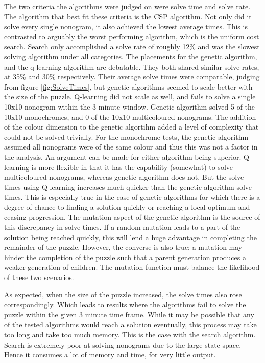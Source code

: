 \documentclass{svproc}
\begin{document}
The two criteria the algorithms were judged on were solve time and solve rate. The algorithm that best fit these criteria is the CSP algorithm.
Not only did it solve every single nonogram, it also achieved the lowest average times.
This is contrasted to arguably the worst performing algorithm, which is the uniform cost search.
Search only accomplished a solve rate of roughly 12\% and was the slowest solving algorithm under all categories.
The placements for the genetic algorithm, and the q-learning algorithm are debatable.
They both shared similar solve rates, at 35\% and 30\% respectively.
Their average solve times were comparable, judging from figure \ref{fig:SolveTimes}, but genetic algorithms seemed to scale better with the size of the puzzle.
Q-learning did not scale as well, and fails to solve a single 10x10 nonogram within the 3 minute window.
Genetic algorithm solved 5 of the 10x10 monochromes, and 0 of the 10x10 multicoloured nonograms. The addition of the colour dimension to the genetic algortihm added a level of complexity that could not be solved trivially. For the monochrome tests, the genetic algorithm assumed all nonograms were of the same colour and thus this was not a factor in the analysis.
An argument can be made for either algorithm being superior. Q-learning is more flexible in that it has the capability (somewhat) to solve multicoloured nonograms, whereas genetic algorithm does not. But the solve times using Q-learning increases much quicker than the genetic algorithm solve times. This is especially true in the case of genetic algorithms for which there is a degree of chance to finding a solution quickly or reaching a local optimum and ceasing progression. The mutation aspect of the genetic algorithm is the source of this discrepancy in solve times. If a random mutation leads to a part of the solution being reached quickly, this will lend a huge advantage in completing the remainder of the puzzle. However, the converse is also true; a mutation may hinder the completion of the puzzle such that a parent generation produces a weaker generation of children. The mutation function must balance the likelihood of these two scenarios.

As expected, when the size of the puzzle increased, the solve times also rose correspondingly.
Which leads to results where the algorithms fail to solve the puzzle within the given 3 minute time frame.
While it may be possible that any of the tested algorithms would reach a solution eventually, this process may take too long and take too much memory.
This is the case with the search algorithm.
Search is extremely poor at solving nonograms due to the large state space.
Hence it consumes a lot of memory and time, for very little output.
\end{document}

